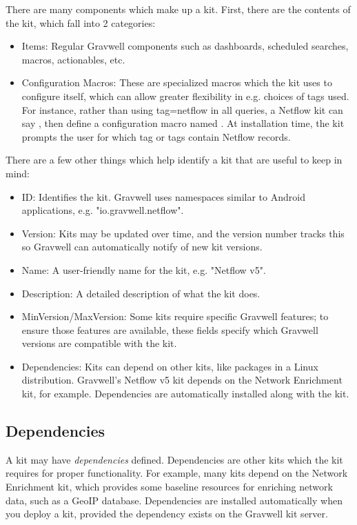 There are many components which make up a kit. First, there are the contents of the kit, which fall into 2 categories:

\begin{itemize}
\tightlist
\item
  Items: Regular Gravwell components such as dashboards, scheduled searches, macros, actionables, etc.
\item
  Configuration Macros: These are specialized macros which the kit uses to configure itself, which can allow greater flexibility in e.g. choices of tags used. For instance, rather than using tag=netflow in all queries, a Netflow kit can say , then define a configuration macro named . At installation time, the kit prompts the user for which tag or tags contain Netflow records.
\end{itemize}

There are a few other things which help identify a kit that are useful to keep in mind:

\begin{itemize}
\tightlist
\item
ID: Identifies the kit. Gravwell uses namespaces similar to Android applications, e.g. "io.gravwell.netflow".
\item
Version: Kits may be updated over time, and the version number tracks this so Gravwell can automatically notify of new kit versions.
\item
Name: A user-friendly name for the kit, e.g. "Netflow v5".
\item
Description: A detailed description of what the kit does.
\item
MinVersion/MaxVersion: Some kits require specific Gravwell features; to ensure those features are available, these fields specify which Gravwell versions are compatible with the kit.
\item
Dependencies: Kits can depend on other kits, like packages in a Linux distribution. Gravwell's Netflow v5 kit depends on the Network Enrichment kit, for example. Dependencies are automatically installed along with the kit.
\end{itemize}

\subsection{Dependencies}

A kit may have \emph{dependencies} defined. Dependencies are other kits which the kit requires for proper functionality. For example, many kits depend on the Network Enrichment kit, which provides some baseline resources for enriching network data, such as a GeoIP database. Dependencies are installed automatically when you deploy a kit, provided the dependency exists on the Gravwell kit server.

